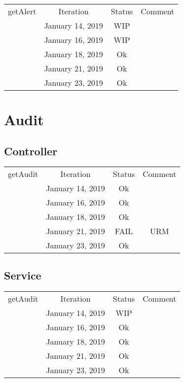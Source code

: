 \documentclass{scrreprt}
\begin{document}
	\\ \\ \\
	\begin{tabularx}{12cm}{X|c|c|c}
		getAlert & Iteration & Status & Comment  \\
		& January 14, 2019 & WIP & \\
		& January 16, 2019 & WIP & \\
		& January 18, 2019 & Ok & \\
		& January 21, 2019 & Ok & \\
		& January 23, 2019 & Ok & \\
	\end{tabularx}

\section{Audit}

\subsection{Controller}
	\begin{tabularx}{12cm}{X|c|c|c}
		getAudit & Iteration & Status & Comment \\
		& January 14, 2019 & Ok & \\
		& January 16, 2019 & Ok & \\
		& January 18, 2019 & Ok & \\
		& January 21, 2019 & FAIL & URM \\
		& January 23, 2019 & Ok & \\
	\end{tabularx}

\subsection{Service}		
	\begin{tabularx}{12cm}{X|c|c|c}
		getAudit & Iteration & Status & Comment  \\
		& January 14, 2019 & WIP & \\
		& January 16, 2019 & Ok & \\
		& January 18, 2019 & Ok & \\
		& January 21, 2019 & Ok & \\
		& January 23, 2019 & Ok & \\
	\end{tabularx}
	\\ \\ \\
\end{document}

